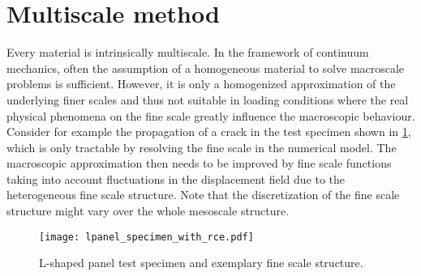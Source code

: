 \documentclass[AMA,STIX1COL,doublespace]{WileyNJD-v2}
\begin{document}
\section{Multiscale method}%
\label{sec:multiscale_method}
Every material is intrinsically multiscale. 
In the framework of continuum mechanics, often the assumption of a homogeneous material to solve macroscale problems is sufficient.
However, it is only a homogenized approximation of the underlying finer scales and thus not suitable in loading conditions where the real physical phenomena on the fine scale greatly influence the macroscopic behaviour.
Consider for example the propagation of a crack in the test specimen shown in \cref{fig:lpanel_specimen_with_rce}, which is only tractable by resolving the fine scale in the numerical model.
The macroscopic approximation then needs to be improved by fine scale functions taking into account fluctuations in the displacement field due to the heterogeneous fine scale structure.
Note that the discretization of the fine scale structure might vary over the whole mesoscale structure. 

\begin{figure}[tb]
	\centering
	\texttt{[image: lpanel\_specimen\_with\_rce.pdf]}
	\caption{L-shaped panel test specimen and exemplary fine scale structure.}%
	\label{fig:lpanel_specimen_with_rce}
\end{figure}
\end{document}
